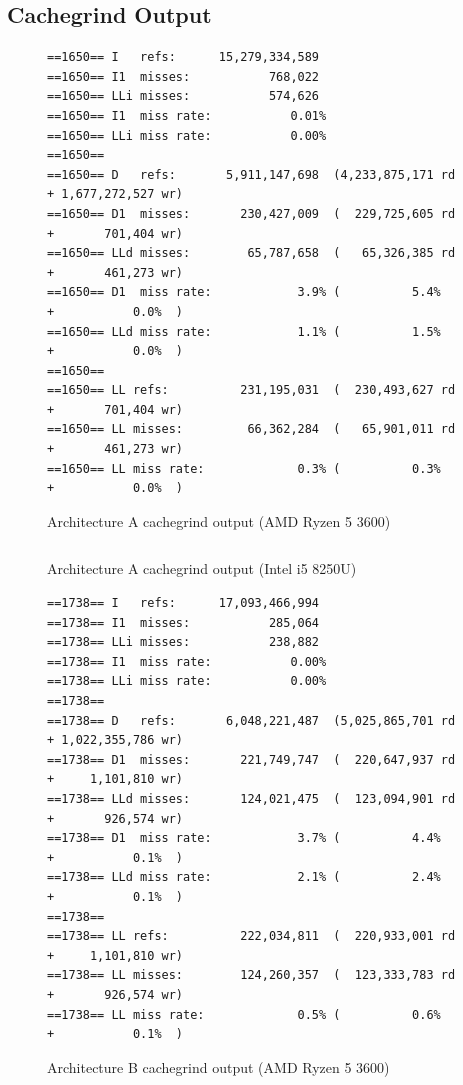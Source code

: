 \documentclass{article}
\begin{document}
\subsection{Cachegrind Output}
\begin{figure}[!h]
\centering
\begin{BVerbatim}
==1650== I   refs:      15,279,334,589
==1650== I1  misses:           768,022
==1650== LLi misses:           574,626
==1650== I1  miss rate:           0.01%
==1650== LLi miss rate:           0.00%
==1650== 
==1650== D   refs:       5,911,147,698  (4,233,875,171 rd   + 1,677,272,527 wr)
==1650== D1  misses:       230,427,009  (  229,725,605 rd   +       701,404 wr)
==1650== LLd misses:        65,787,658  (   65,326,385 rd   +       461,273 wr)
==1650== D1  miss rate:            3.9% (          5.4%     +           0.0%  )
==1650== LLd miss rate:            1.1% (          1.5%     +           0.0%  )
==1650== 
==1650== LL refs:          231,195,031  (  230,493,627 rd   +       701,404 wr)
==1650== LL misses:         66,362,284  (   65,901,011 rd   +       461,273 wr)
==1650== LL miss rate:             0.3% (          0.3%     +           0.0%  )
\end{BVerbatim}
\caption{Architecture A cachegrind output (AMD Ryzen 5 3600)}
\label{arch_a_cachegrind_pc}
\end{figure}

\begin{figure}[!h]
\centering
\begin{BVerbatim}
\end{BVerbatim}
\caption{Architecture A cachegrind output (Intel i5 8250U)}
\label{arch_a_cachegrind_laptop}
\end{figure}

\begin{figure}[!h]
\centering
\begin{BVerbatim}
==1738== I   refs:      17,093,466,994
==1738== I1  misses:           285,064
==1738== LLi misses:           238,882
==1738== I1  miss rate:           0.00%
==1738== LLi miss rate:           0.00%
==1738== 
==1738== D   refs:       6,048,221,487  (5,025,865,701 rd   + 1,022,355,786 wr)
==1738== D1  misses:       221,749,747  (  220,647,937 rd   +     1,101,810 wr)
==1738== LLd misses:       124,021,475  (  123,094,901 rd   +       926,574 wr)
==1738== D1  miss rate:            3.7% (          4.4%     +           0.1%  )
==1738== LLd miss rate:            2.1% (          2.4%     +           0.1%  )
==1738== 
==1738== LL refs:          222,034,811  (  220,933,001 rd   +     1,101,810 wr)
==1738== LL misses:        124,260,357  (  123,333,783 rd   +       926,574 wr)
==1738== LL miss rate:             0.5% (          0.6%     +           0.1%  )
\end{BVerbatim}
\caption{Architecture B cachegrind output (AMD Ryzen 5 3600)}
\label{arch_b_cachegrind_pc}
\end{figure}
\end{document}
